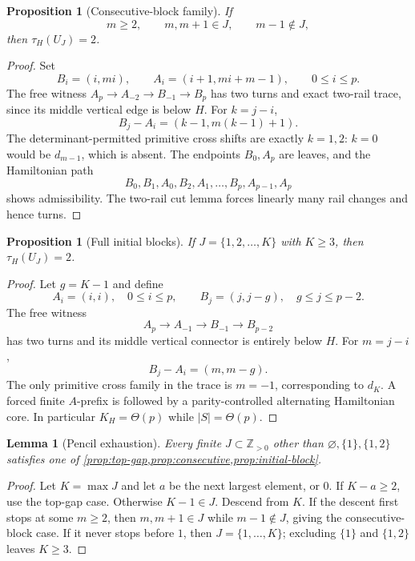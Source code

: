 \documentclass[11pt]{article}
\newtheorem{proposition}[theorem]{Proposition}
\newtheorem{lemma}[theorem]{Lemma}
\theoremstyle{definition}
\newcommand{\Z}{\mathbb Z}
\begin{document}
\begin{proposition}[Consecutive-block family]\label{prop:consecutive}
If
\[
m\ge2,\qquad m,m+1\in J,\qquad m-1\notin J,
\]
then $\tau_H(U_J)=2$.
\end{proposition}
\begin{proof}
Set
\[
B_i=(i,mi),\qquad A_i=(i+1,mi+m-1),\qquad0\le i\le p.
\]
The free witness $A_p\to A_{-2}\to B_{-1}\to B_p$ has two turns and exact two-rail trace, since its middle vertical edge is below $H$.  For $k=j-i$,
\[
B_j-A_i=(k-1,m(k-1)+1).
\]
The determinant-permitted primitive cross shifts are exactly $k=1,2$: $k=0$ would be $d_{m-1}$, which is absent.  The endpoints $B_0,A_p$ are leaves, and the Hamiltonian path
\[
B_0,B_1,A_0,B_2,A_1,\ldots,B_p,A_{p-1},A_p
\]
shows admissibility.  The two-rail cut lemma forces linearly many rail changes and hence turns.
\end{proof}

\begin{proposition}[Full initial blocks]\label{prop:initial-block}
If $J=\{1,2,\ldots,K\}$ with $K\ge3$, then $\tau_H(U_J)=2$.
\end{proposition}
\begin{proof}
Let $g=K-1$ and define
\[
A_i=(i,i),\quad0\le i\le p,
\qquad
B_j=(j,j-g),\quad g\le j\le p-2.
\]
The free witness
\[
A_p\to A_{-1}\to B_{-1}\to B_{p-2}
\]
has two turns and its middle vertical connector is entirely below $H$.  For $m=j-i$,
\[
B_j-A_i=(m,m-g).
\]
The only primitive cross family in the trace is $m=-1$, corresponding to $d_K$.  A forced finite $A$-prefix is followed by a parity-controlled alternating Hamiltonian core.  In particular $K_H=\Theta(p)$ while $|S|=\Theta(p)$.
\end{proof}

\begin{lemma}[Pencil exhaustion]\label{lem:pencil-exhaust}
Every finite $J\subset\Z_{>0}$ other than $\varnothing,\{1\},\{1,2\}$ satisfies one of \cref{prop:top-gap,prop:consecutive,prop:initial-block}.
\end{lemma}
\begin{proof}
Let $K=\max J$ and let $a$ be the next largest element, or $0$.  If $K-a\ge2$, use the top-gap case.  Otherwise $K-1\in J$.  Descend from $K$.  If the descent first stops at some $m\ge2$, then $m,m+1\in J$ while $m-1\notin J$, giving the consecutive-block case.  If it never stops before $1$, then $J=\{1,\ldots,K\}$; excluding $\{1\}$ and $\{1,2\}$ leaves $K\ge3$.
\end{proof}
\end{document}
